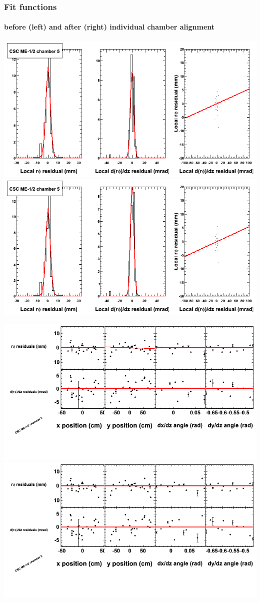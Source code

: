 \documentclass[compress]{beamer}
\begin{document}
\begin{frame}
\frametitle{Fit functions}
\framesubtitle{before (left) and after (right) individual chamber alignment}
\includegraphics[width=0.5\linewidth]{ringfits_3dof/beforefit_MEm12_05_bellcurve.png} \includegraphics[width=0.5\linewidth]{ringfits_3dof/afterfit_MEm12_05_bellcurve.png}

\includegraphics[width=0.5\linewidth]{ringfits_3dof/beforefit_MEm12_05_polynomials.png} \includegraphics[width=0.5\linewidth]{ringfits_3dof/afterfit_MEm12_05_polynomials.png}
\end{frame}
\end{document}
